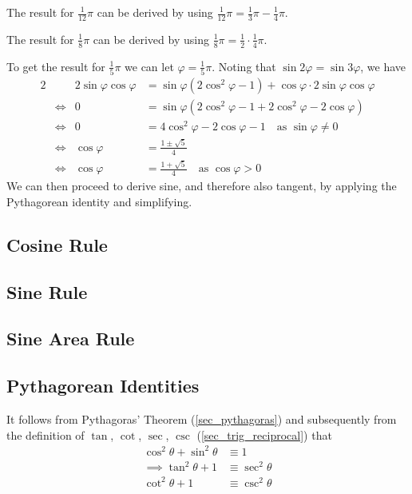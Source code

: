 The result for \(\frac 1{12} \pi\) can be derived by using
\(\frac 1{12} \pi = \frac 13 \pi - \frac 14 \pi\).

The result for \(\frac 18 \pi\) can be derived by using
\(\frac 18 \pi = \frac 12 \cdot \frac 14 \pi\).

To get the result for \(\frac 15 \pi\) we can let
\(\varphi = \frac 15 \pi\).  Noting that
\(\sin 2\varphi = \sin 3\varphi\), we have
\begin{alignat*}2
&& 2\sin \varphi \cos \varphi
    &= \sin \varphi (2\cos^2 \varphi - 1)
     + \cos \varphi \cdot 2\sin \varphi \cos \varphi \\
&\iff& 0 &= \sin \varphi (2\cos^2 \varphi - 1
                        + 2\cos^2 \varphi - 2\cos \varphi) \\
&\iff& 0 &= 4\cos^2 \varphi - 2\cos \varphi - 1
    \quad \text{as \(\sin \varphi \ne 0\)} \\
&\iff& \cos \varphi &= \frac{1 \pm \sqrt 5} 4 \\
&\iff& \cos \varphi &= \frac{1 + \sqrt 5} 4
    \quad \text{as \(\cos \varphi > 0\)}
\end{alignat*}
We can then proceed to derive sine, and therefore also tangent, by applying
the Pythagorean identity and simplifying.

\subsection{Cosine Rule}

\subsection{Sine Rule}

\subsection{Sine Area Rule}

\subsection{Pythagorean Identities} \label{sec_trig_pythag}

It follows from Pythagoras' Theorem (\ref{sec_pythagoras})
and subsequently from the definition of
\(\tan\), \(\cot\), \(\sec\), \(\csc\) (\ref{sec_trig_reciprocal}) that
\begin{align}
\cos^2 \theta + \sin^2 \theta &\equiv 1 \\
\implies \tan^2 \theta + 1 &\equiv \sec^2 \theta \\
\cot^2 \theta + 1 &\equiv \csc^2 \theta
\end{align}

